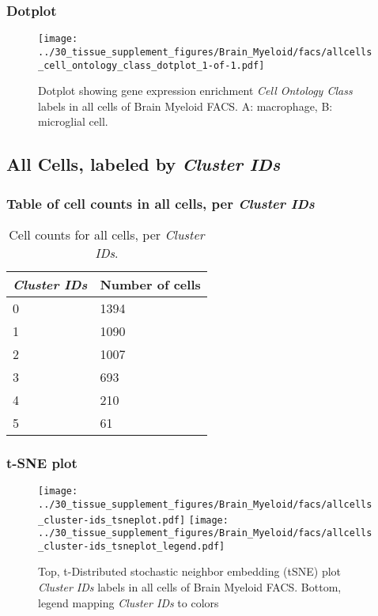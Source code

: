 \clearpage

\subsubsection{Dotplot}
\begin{figure}[h]
\centering
\texttt{[image: ../30\_tissue\_supplement\_figures/Brain\_Myeloid/facs/allcells\_cell\_ontology\_class\_dotplot\_1-of-1.pdf]}

\caption{ Dotplot  showing gene expression enrichment \emph{Cell Ontology Class} labels in all cells of Brain Myeloid FACS. A: macrophage, B: microglial cell.}
\end{figure}


\clearpage

\subsection{All Cells, labeled by \emph{Cluster IDs}}
\subsubsection{Table of cell counts in all cells, per \emph{Cluster IDs}}\begin{table}[h]
\centering
\label{my-label}
\begin{tabular}{@{}ll@{}}
\toprule

\emph{Cluster IDs}& Number of cells \\ \midrule
0 & 1394 \\

1 & 1090 \\

2 & 1007 \\

3 & 693 \\

4 & 210 \\

5 & 61 \\
\bottomrule
\end{tabular}
\caption{Cell counts for all cells, per \emph{Cluster IDs}.}
\end{table}

\clearpage
\subsubsection{t-SNE plot}
\begin{figure}[h]
\centering
\texttt{[image: ../30\_tissue\_supplement\_figures/Brain\_Myeloid/facs/allcells\_cluster-ids\_tsneplot.pdf]}
\texttt{[image: ../30\_tissue\_supplement\_figures/Brain\_Myeloid/facs/allcells\_cluster-ids\_tsneplot\_legend.pdf]}
\caption{Top, t-Distributed stochastic neighbor embedding (tSNE) plot  \emph{Cluster IDs} labels in all cells of Brain Myeloid FACS. Bottom, legend mapping \emph{Cluster IDs} to colors}
\end{figure}


